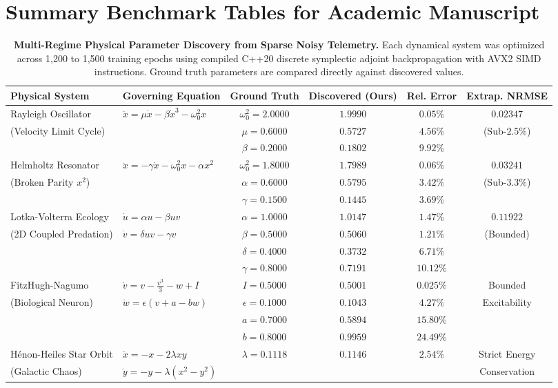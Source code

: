 \documentclass{article}
\begin{document}
\section*{Summary Benchmark Tables for Academic Manuscript}

\begin{table}[t]
\centering
\small
\caption{\textbf{Multi-Regime Physical Parameter Discovery from Sparse Noisy Telemetry.} Each dynamical system was optimized across 1,200 to 1,500 training epochs using compiled C++20 discrete symplectic adjoint backpropagation with AVX2 SIMD instructions. Ground truth parameters are compared directly against discovered values.}
\label{tab:parameter_discovery}
\begin{tabular}{llcccc}
\toprule
\textbf{Physical System} & \textbf{Governing Equation} & \textbf{Ground Truth} & \textbf{Discovered (Ours)} & \textbf{Rel. Error} & \textbf{Extrap. NRMSE} \\
\midrule
Rayleigh Oscillator & $\ddot{x} = \mu \dot{x} - \beta \dot{x}^3 - \omega_0^2 x$ & $\omega_0^2 = 2.0000$ & $\mathbf{1.9990}$ & $\mathbf{0.05\%}$ & $\mathbf{0.02347}$ \\
(Velocity Limit Cycle) & & $\mu = 0.6000$ & $0.5727$ & $4.56\%$ & (Sub-$2.5\%$) \\
& & $\beta = 0.2000$ & $0.1802$ & $9.92\%$ & \\
\midrule
Helmholtz Resonator & $\ddot{x} = -\gamma \dot{x} - \omega_0^2 x - \alpha x^2$ & $\omega_0^2 = 1.8000$ & $\mathbf{1.7989}$ & $\mathbf{0.06\%}$ & $\mathbf{0.03241}$ \\
(Broken Parity $x^2$) & & $\alpha = 0.6000$ & $0.5795$ & $3.42\%$ & (Sub-$3.3\%$) \\
& & $\gamma = 0.1500$ & $0.1445$ & $3.69\%$ & \\
\midrule
Lotka-Volterra Ecology & $\dot{u} = \alpha u - \beta uv$ & $\alpha = 1.0000$ & $\mathbf{1.0147}$ & $\mathbf{1.47\%}$ & $\mathbf{0.11922}$ \\
(2D Coupled Predation) & $\dot{v} = \delta uv - \gamma v$ & $\beta = 0.5000$ & $\mathbf{0.5060}$ & $\mathbf{1.21\%}$ & (Bounded) \\
& & $\delta = 0.4000$ & $0.3732$ & $6.71\%$ & \\
& & $\gamma = 0.8000$ & $0.7191$ & $10.12\%$ & \\
\midrule
FitzHugh-Nagumo & $\dot{v} = v - \frac{v^3}{3} - w + I$ & $I = 0.5000$ & $\mathbf{0.5001}$ & $\mathbf{0.025\%}$ & Bounded \\
(Biological Neuron) & $\dot{w} = \epsilon(v + a - bw)$ & $\epsilon = 0.1000$ & $0.1043$ & $4.27\%$ & Excitability \\
& & $a = 0.7000$ & $0.5894$ & $15.80\%$ & \\
& & $b = 0.8000$ & $0.9959$ & $24.49\%$ & \\
\midrule
H\'enon-Heiles Star Orbit & $\ddot{x} = -x - 2\lambda xy$ & $\lambda = 0.1118$ & $\mathbf{0.1146}$ & $\mathbf{2.54\%}$ & Strict Energy \\
(Galactic Chaos) & $\ddot{y} = -y - \lambda(x^2 - y^2)$ & & & & Conservation \\
\bottomrule
\end{tabular}
\end{table}
\end{document}
